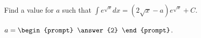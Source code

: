 \documentclass{ximera}
\author{Jim Talamo}
\begin{document}
\begin{exercise}
Find a value for $a$ such that $\int e^{\sqrt{x}} dx = (2 \sqrt{x} -a)e^{\sqrt{x}} +C$. 

$a = \begin{prompt} \answer{2} \end{prompt}$.


\end{exercise}
\end{document}
